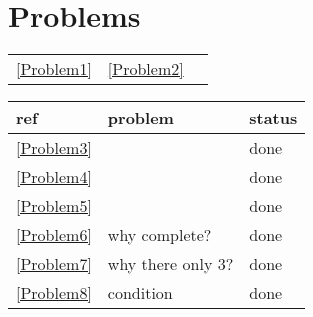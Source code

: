 \documentclass[11pt]{article}
\begin{document}
\section{Problems}
\label{sec:org162db7c}
\begin{center}
\begin{tabular}{lll}
\ref{Problem1} & \ref{Problem2} & \\
\end{tabular}
\end{center}

\begin{center}
\begin{tabular}{lll}
ref & problem & status\\
\hline
\ref{Problem3} &  & done\\
\ref{Problem4} &  & done\\
\ref{Problem5} &  & done\\
\ref{Problem6} & why complete? & done\\
\ref{Problem7} & why there only 3? & done\\
\ref{Problem8} & condition & done\\
\end{tabular}
\end{center}

\label{bibliographystyle link}


\label{bibliography link}

\end{document}
